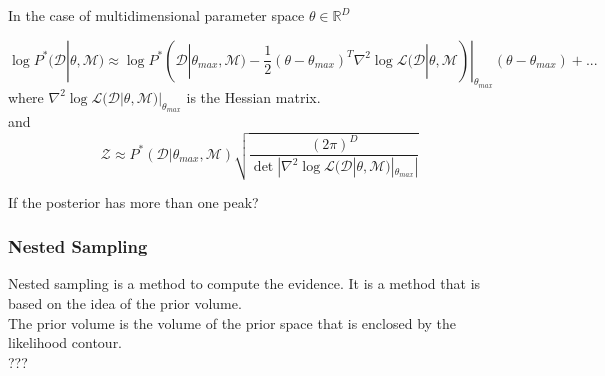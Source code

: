 \documentclass[12pt,a4paper]{article}
\begin{document}
In the case of multidimensional parameter space $\theta \in \mathbb{R}^{D} $

$$
    \log P^{*}(\mathcal{D}|\theta, \mathcal{M}) \approx \log P^{*}(\mathcal{D}|\theta_{max}, \mathcal{M}) - \frac{1}{2}(\theta - \theta_{max})^T \nabla^2 \log \mathcal{L}(\mathcal{D}|\theta, \mathcal{M})|_{\theta_{max}}(\theta - \theta_{max})+ ...
$$
where $\nabla^2 \log \mathcal{L}(\mathcal{D}|\theta, \mathcal{M})|_{\theta_{max}}$ is the Hessian matrix.\\
and
$$
    \mathcal{Z} \approx P^{*}(\mathcal{D}|\theta_{max}, \mathcal{M}) \sqrt{\frac{(2\pi)^D}{\det |\nabla^2 \log \mathcal{L}(\mathcal{D}|\theta, \mathcal{M})|_{\theta_{max}}|}}
$$

If the posterior has more than one peak? 

\subsubsection{Nested Sampling}
Nested sampling is a method to compute the evidence. It is a method that is based on the idea of the prior volume.\\
The prior volume is the volume of the prior space that is enclosed by the likelihood contour.\\

???
\end{document}
